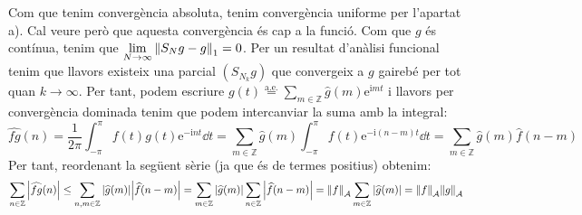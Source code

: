 \documentclass[10pt,a4paper]{article}
\newcommand{\ZZ}{\ensuremath{\mathbb{Z}}} %
\newcommand{\ii}{\mathrm{i}} %
\theoremstyle{definition}
\renewcommand{\exp}[1]{\mathrm{e}^{#1}} %
\begin{document}
\begin{enumerate}
\begin{enumerate}
                Com que tenim convergència absoluta, tenim convergència uniforme per l'apartat a). Cal veure però que aquesta convergència és cap a la funció. Com que $g$ és contínua, tenim que $\displaystyle\lim_{N\to\infty}\norm{S_Ng-g}_1=0$. Per un resultat d'anàlisi funcional tenim que llavors existeix una parcial $(S_{N_k}g)$ que convergeix a $g$ gairebé per tot quan $k\to\infty$. Per tant, podem escriure $g(t)\overset{\mathrm{a.e.}}{=}\sum_{m\in\ZZ}\widehat{g}(m)\exp{\ii m t}$ i llavors per convergència dominada tenim que podem intercanviar la suma amb la integral:
                $$\widehat{fg}(n)=\frac{1}{2\pi}\int_{-\pi}^\pi f(t)g(t)\exp{-\ii n t}\dd{t}=\sum_{m\in\ZZ}\widehat{g}(m)\int_{-\pi}^\pi f(t)\exp{-\ii (n-m) t}\dd{t}=\sum_{m\in\ZZ}\widehat{g}(m)\widehat{f}(n-m)$$
                Per tant, reordenant la següent sèrie (ja que és de termes positius) obtenim:
                $$\sum_{n\in\ZZ}\abs{\widehat{fg}(n)}\leq\sum_{n,m\in\ZZ}\abs{\widehat{g}(m)}\abs{\widehat{f}(n-m)}=\sum_{m\in\ZZ}\abs{\widehat{g}(m)}\sum_{n\in\ZZ}\abs{\widehat{f}(n-m)}=\norm{f}_\mathcal{A}\sum_{m\in\ZZ}\abs{\widehat{g}(m)}=\norm{f}_{\mathcal{A}}\norm{g}_{\mathcal{A}}$$
        \end{enumerate}


\end{enumerate}
\end{document}
